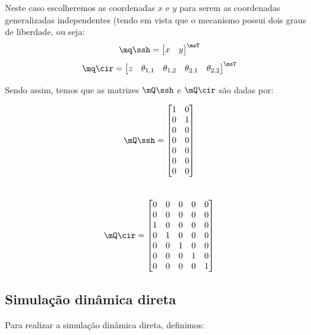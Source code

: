 \documentclass[]{politex}
\begin{document}
Neste caso escolheremos as coordenadas $x$ e $y$ para serem as coordenadas generalizadas independentes (tendo em vista que o mecanismo possui dois graus de liberdade, ou seja:
\begin{equation}
\mq\ssh = \begin{bmatrix}
x & y
\end{bmatrix}^\msT
\end{equation}
\begin{equation}
\mq\cir = \begin{bmatrix}
z & \theta_{1,1} & \theta_{1,2} & \theta_{2,1} & \theta_{2,2}
\end{bmatrix}^\msT
\end{equation}

Sendo assim, temos que as matrizes $\mQ\ssh$ e $\mQ\cir$ são dadas por:
\begin{multicols}{2}
\begin{equation}
\mQ\ssh = \begin{bmatrix}
1 & 0 \\
0 & 1 \\
0 & 0 \\
0 & 0 \\
0 & 0 \\
0 & 0 \\
0 & 0 \\
\end{bmatrix}
\end{equation} \\
\begin{equation}
\mQ\cir = \begin{bmatrix}
0 & 0 & 0 & 0 & 0 \\
0 & 0 & 0 & 0 & 0 \\
1 & 0 & 0 & 0 & 0 \\
0 & 1 & 0 & 0 & 0 \\
0 & 0 & 1 & 0 & 0 \\
0 & 0 & 0 & 1 & 0 \\
0 & 0 & 0 & 0 & 1 \\
\end{bmatrix}
\end{equation}
\end{multicols}

\subsection{Simulação dinâmica direta}

Para realizar a simulação dinâmica direta, definimos:
\end{document}
